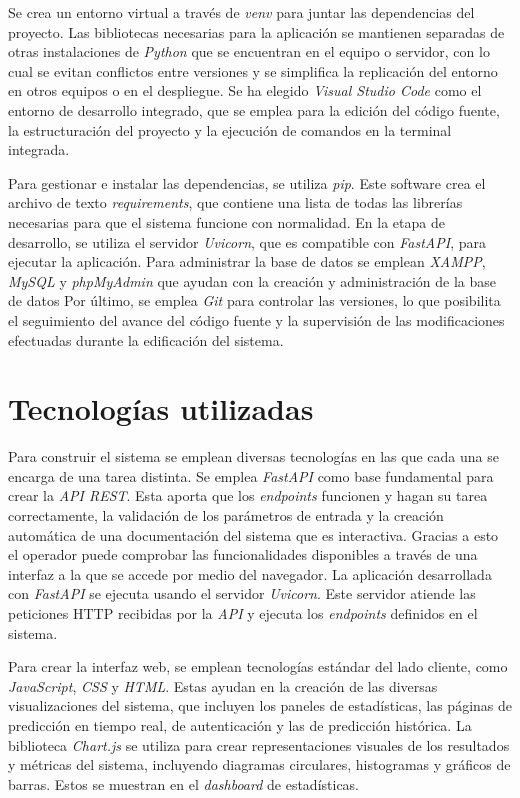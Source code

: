 \documentclass[12pt,a4paper]{report}
\begin{document}
Se crea un entorno virtual a través de \emph{venv} para juntar las dependencias del proyecto. Las bibliotecas necesarias para la aplicación se mantienen separadas de otras instalaciones de \emph{Python} que se encuentran en el equipo o servidor, con lo cual se evitan conflictos entre versiones y se simplifica la replicación del entorno en otros equipos o en el despliegue. Se ha elegido \emph{Visual Studio Code} como el entorno de desarrollo integrado, que se emplea para la edición del código fuente, la estructuración del proyecto y la ejecución de comandos en la terminal integrada. 

Para gestionar e instalar las dependencias, se utiliza \emph{pip}. Este software crea el archivo de texto \emph{requirements}, que contiene una lista de todas las librerías necesarias para que el sistema funcione con normalidad. En la etapa de desarrollo, se utiliza el servidor \emph{Uvicorn}, que es compatible con \emph{FastAPI}, para ejecutar la aplicación. Para administrar la base de datos se emplean \emph{XAMPP}, \emph{MySQL} y \emph{phpMyAdmin} que ayudan con la creación y administración de la base de datos Por último, se emplea \emph{Git} para controlar las versiones, lo que posibilita el seguimiento del avance del código fuente y la supervisión de las modificaciones efectuadas durante la edificación del sistema.


\section{Tecnologías utilizadas}

Para construir el sistema se emplean diversas tecnologías en las que cada una se encarga de una tarea distinta. Se emplea \emph{FastAPI} como base fundamental para crear la \emph{API REST}. Esta aporta que los \emph{endpoints} funcionen y hagan su tarea correctamente, la validación de los parámetros de entrada y la creación automática de una documentación del sistema que es interactiva. Gracias a esto el operador puede comprobar las funcionalidades disponibles a través de una interfaz a la que se accede por medio del navegador. La aplicación desarrollada con \emph{FastAPI} se ejecuta usando el servidor \emph{Uvicorn}. Este servidor atiende las peticiones HTTP recibidas por la \emph{API} y ejecuta los \emph{endpoints} definidos en el sistema.

Para crear la interfaz web, se emplean tecnologías estándar del lado cliente, como \emph{JavaScript}, \emph{CSS} y \emph{HTML}. Estas ayudan en la creación de las diversas visualizaciones del sistema, que incluyen los paneles de estadísticas, las páginas de predicción en tiempo real, de autenticación y las de predicción histórica. La biblioteca \emph{Chart.js} se utiliza para crear representaciones visuales de los resultados y métricas del sistema, incluyendo diagramas circulares, histogramas y gráficos de barras. Estos se muestran en el \emph{dashboard} de estadísticas.
\end{document}
